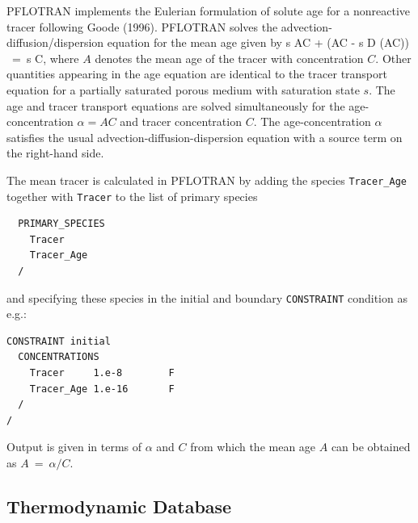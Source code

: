\documentclass[12pt]{article}
\def\EQ#1\EN{\begin{equation}#1\end{equation}}
\newcommand{\eq}{\ =\ }
\newcommand{\p}{{\partial}}
\renewcommand{\a}{{\alpha}}
\newcommand{\bnabla}{\boldsymbol{\nabla}}
\newcommand{\bq}{\boldsymbol{q}}
\begin{document}
PFLOTRAN implements the Eulerian formulation of solute age for a nonreactive tracer following Goode (1996). PFLOTRAN solves the advection-diffusion/dispersion equation for the mean age given by
\EQ
\frac{\p}{\p t} \varphi s AC + \bnabla\cdot\Big(\bq AC - \varphi s D \bnabla (AC)\Big) \eq \varphi s C,
\EN
where $A$ denotes the mean age of the tracer with concentration $C$. Other quantities appearing in the age equation are identical to the tracer transport equation for a partially saturated porous medium with saturation state $s$. The age and tracer transport equations are solved simultaneously for the age-concentration $\alpha = A C$ and tracer concentration $C$. The age-concentration $\a$ satisfies the usual advection-diffusion-dispersion equation with a source term on the right-hand side.

The mean tracer is calculated in PFLOTRAN by adding the species {\tt Tracer\_Age} together with {\tt Tracer} to the list of primary species
\begin{verbatim}
  PRIMARY_SPECIES
    Tracer
    Tracer_Age
  /
\end{verbatim}
and specifying these species in the initial and boundary {\tt CONSTRAINT} condition as e.g.:
\begin{verbatim}
CONSTRAINT initial
  CONCENTRATIONS
    Tracer     1.e-8        F
    Tracer_Age 1.e-16       F
  /
/
\end{verbatim}
Output is given in terms of $\alpha$ and $C$ from which the mean age $A$ can be obtained as $A\eq\alpha/C$. 

\subsection{Thermodynamic Database}
\end{document}
